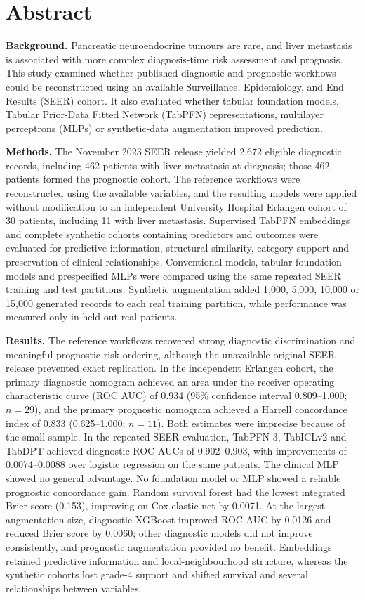 \section*{Abstract}
{}

\textbf{Background.}
Pancreatic neuroendocrine tumours are rare, and liver metastasis is associated
with more complex diagnosis-time risk assessment and prognosis. This study
examined whether published diagnostic and prognostic workflows could be
reconstructed using an available Surveillance, Epidemiology, and End Results
(SEER) cohort. It also evaluated whether tabular foundation models,
Tabular Prior-Data Fitted Network (TabPFN) representations, multilayer
perceptrons (MLPs) or synthetic-data augmentation improved prediction.

\textbf{Methods.}
The November 2023 SEER release yielded 2,672 eligible diagnostic records,
including 462 patients with liver metastasis at diagnosis; those 462 patients
formed the prognostic cohort. The reference workflows were reconstructed using
the available variables, and the resulting models were applied without
modification to an independent University Hospital Erlangen cohort of 30
patients, including 11 with liver metastasis. Supervised TabPFN embeddings and
complete synthetic cohorts containing predictors and outcomes were evaluated
for predictive information, structural similarity, category support and
preservation of clinical relationships. Conventional models, tabular
foundation models and prespecified MLPs were compared using the same repeated
SEER training and test partitions. Synthetic augmentation added 1,000, 5,000,
10,000 or 15,000 generated records to each real training partition, while
performance was measured only in held-out real patients.

\textbf{Results.}
The reference workflows recovered strong diagnostic discrimination and
meaningful prognostic risk ordering, although the unavailable original SEER
release prevented exact replication. In the independent Erlangen cohort, the
primary diagnostic nomogram achieved an area under the receiver operating
characteristic curve (ROC AUC) of 0.934 (95\% confidence interval
0.809--1.000; $n=29$), and the primary prognostic nomogram achieved a Harrell
concordance index of 0.833 (0.625--1.000; $n=11$). Both estimates were
imprecise because of the small sample. In the repeated SEER evaluation,
TabPFN-3, TabICLv2 and TabDPT achieved diagnostic ROC AUCs of 0.902--0.903,
with improvements of 0.0074--0.0088 over logistic regression on the same
patients. The clinical MLP showed no general advantage. No foundation model or
MLP showed a reliable prognostic concordance gain. Random survival forest had
the lowest integrated Brier score (0.153), improving on Cox elastic net by
0.0071. At the largest augmentation size, diagnostic XGBoost improved ROC AUC
by 0.0126 and reduced Brier score by 0.0060; other diagnostic models did not
improve consistently, and prognostic augmentation provided no benefit.
Embeddings retained predictive information and local-neighbourhood structure,
whereas the synthetic cohorts lost grade-4 support and shifted survival and
several relationships between variables.

